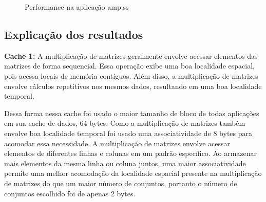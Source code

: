 \documentclass[12pt]{article}
\begin{document}
\begin{figure}[h]
  \centering
  \caption{Performance na aplicação amp.ss}
\end{figure}
    
\subsection{Explicação dos resultados}

\textbf{Cache 1:} 
A multiplicação de matrizes geralmente envolve acessar elementos das matrizes de forma sequencial. Essa operação exibe uma boa localidade espacial, pois acessa locais de memória contíguos. Além disso, a multiplicação de matrizes envolve cálculos repetitivos nos mesmos dados, resultando em uma boa localidade temporal.

Dessa forma nessa cache foi usado o maior tamanho de bloco de todas aplicações em sua cache de dados, 64 bytes. Como a multiplicação de matrizes também envolve boa localidade temporal foi usado uma associatividade de 8 bytes para acomodar essa necessidade. A multiplicação de matrizes envolve acessar elementos de diferentes linhas e colunas em um padrão específico. Ao armazenar mais elementos da mesma linha ou coluna juntos, uma maior associatividade permite uma melhor acomodação da localidade espacial presente na multiplicação de matrizes do que um maior número de conjuntos, portanto o número de conjuntos escolhido foi de apenas 2 bytes.
\end{document}
